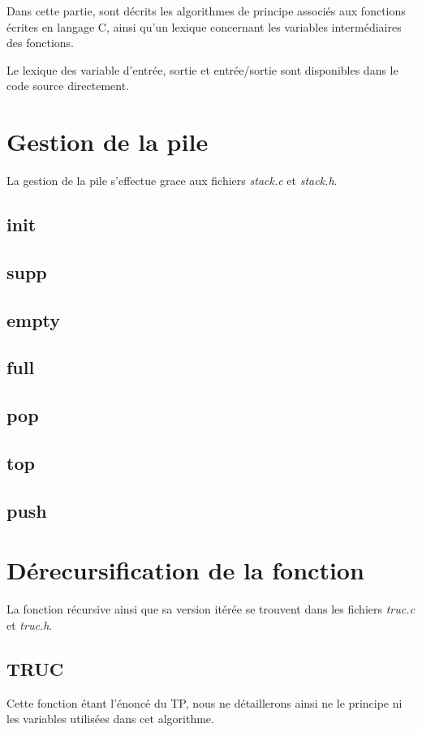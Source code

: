 Dans cette partie, sont décrits les algorithmes de principe associés aux fonctions écrites en langage C, ainsi qu'un lexique concernant les variables intermédiaires des fonctions.

Le lexique des variable d'entrée, sortie et entrée/sortie sont disponibles dans le code source directement.

\section{Gestion de la pile}
  La gestion de la pile s'effectue grace aux fichiers \textit{stack.c} et \textit{stack.h}.
  
  \subsection{init}
  \subsection{supp}
  \subsection{empty}
  \subsection{full}
  \subsection{pop}
  \subsection{top}
  \subsection{push}

\section{Dérecursification de la fonction}
  La fonction récursive ainsi que sa version itérée se trouvent dans les fichiers \textit{truc.c} et \textit{truc.h}.
  \subsection{TRUC}
    Cette fonction étant l'énoncé du TP, nous ne détaillerons ainsi ne le principe ni les variables utilisées dans cet algorithme.
    
